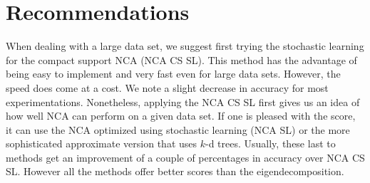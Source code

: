 \section{Recommendations}
\label{sec:eval-recommendations}

When dealing with a large data set, we suggest first trying the stochastic learning for the compact support NCA (NCA CS SL). This method has the advantage of being easy to implement and very fast even for large data sets. However, the speed does come at a cost. We note a slight decrease in accuracy for most experimentations. Nonetheless, applying the NCA CS SL first gives us an idea of how well NCA can perform on a given data set. If one is pleased with the score, it can use the NCA optimized using stochastic learning (NCA SL) or the more sophisticated approximate version that uses $k$-d trees. Usually, these last to methods get an improvement of a couple of percentages in accuracy over NCA CS SL\@. However all the methods offer better scores than the eigendecomposition.
